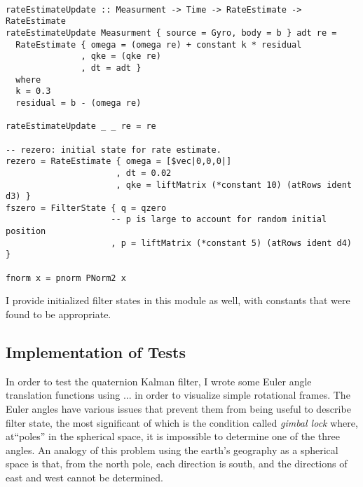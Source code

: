 \documentclass[12pt]{report}
\begin{document}
\begin{lstlisting}

rateEstimateUpdate :: Measurment -> Time -> RateEstimate -> RateEstimate
rateEstimateUpdate Measurment { source = Gyro, body = b } adt re = 
  RateEstimate { omega = (omega re) + constant k * residual
               , qke = (qke re)
               , dt = adt }
  where 
  k = 0.3
  residual = b - (omega re)

rateEstimateUpdate _ _ re = re 

-- rezero: initial state for rate estimate. 
rezero = RateEstimate { omega = [$vec|0,0,0|]
                      , dt = 0.02
                      , qke = liftMatrix (*constant 10) (atRows ident d3) }
fszero = FilterState { q = qzero
                     -- p is large to account for random initial position
                     , p = liftMatrix (*constant 5) (atRows ident d4) }

fnorm x = pnorm PNorm2 x
\end{lstlisting}
I provide initialized filter states in this module as well, with constants that were found to be appropriate.

\subsection{Implementation of Tests}
In order to test the quaternion Kalman filter, I wrote some Euler angle translation functions using ... in order to visualize simple rotational frames. The Euler angles have various issues that prevent them from being useful to describe filter state, the most significant of which is the condition called \emph{gimbal lock} where, at``poles'' in the spherical space, it is impossible to determine one of the three angles. An analogy of this problem using the earth's geography as a spherical space is that, from the north pole, each direction is south, and the directions of east and west cannot be determined.
\end{document}
